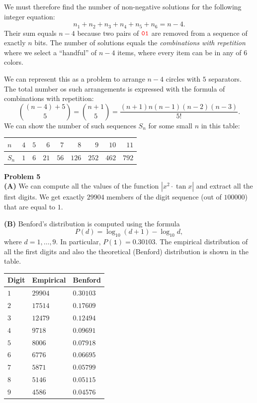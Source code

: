 \documentclass[jou]{apa6}
\begin{document}
We must therefore find the number of non-negative solutions for the following integer 
equation: 
$$n_1 + n_2 + n_3 + n_4 + n_5 + n_6 = n-4.$$
Their sum equals $n-4$ because two pairs of $\textcolor{red}{\mathtt{01}}$ are removed from a 
sequence of exactly $n$ bits. 
The number of solutions equals the {\em combinations with repetition} where we 
select a ``handful'' of $n-4$ items, where every item can be in any of $6$ colors. 

We can represent this as a problem to arrange $n-4$ circles with $5$ separators. 
The total number os such arrangements is expressed with the formula of combinations with repetition: 
$${(n-4) + 5 \choose 5} = {n+1 \choose 5} = \frac{(n+1)n(n-1)(n-2)(n-3)}{5!}.$$
We can show the number of such sequences $S_n$ for some small $n$ in this table:

\begin{tabular}{|l|r|r|r|r|r|r|r|r|} \\ \hline
$n$   & $4$ & $5$ & $6$  & $7$  & $8$   & $9$   & $10$ & $11$ \\ \hline
$S_n$ & $1$ & $6$ & $21$ & $56$ & $126$ & $252$ & $462$ & $792$ \\ \hline
\end{tabular}


\vspace{10pt}
{\bf Problem 5}\\

{\bf (A)} We can compute all the values of the function $|x^2 \cdot \tan x|$
and extract all the first digits. 
We get exactly $29904$ members of the digit sequence (out of 
$100000$) that are equal to $1$. 

{\bf (B)} Benford's distribution is computed using
the formula 
$$P(d) = \log_{10} (d+1) - \log_{10} d,$$
where $d=1,\ldots,9$. In particular, 
$P(\mathtt{1}) = 0.30103$. 
The empirical distribution of all the first digits 
and also the theoretical (Benford) distribution is shown in the table. 


\begin{tabular}{|l|l|l|} \hline
Digit & Empirical & Benford \\ \hline
$1$ & $29904$ & $0.30103$ \\ \hline
$2$ & $17514$ & $0.17609$ \\ \hline
$3$ & $12479$ & $0.12494$ \\ \hline
$4$ & $9718$ & $0.09691$ \\ \hline
$5$ & $8006$ & $0.07918$ \\ \hline
$6$ & $6776$ & $0.06695$ \\ \hline
$7$ & $5871$ & $0.05799$ \\ \hline
$8$ & $5146$ & $0.05115$ \\ \hline
$9$ & $4586$ & $0.04576$ \\ \hline
\end{tabular}
\end{document}
